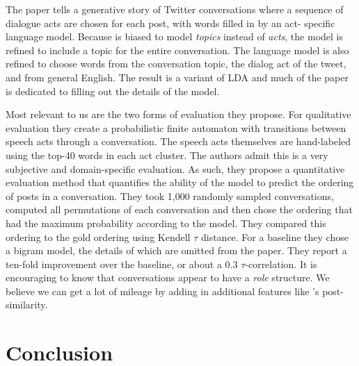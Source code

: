 \documentclass{article}
\begin{document}
The paper tells a generative story of Twitter conversations where a sequence
of dialogue acts are chosen for each post, with words filled in by an act-
specific language model. Because is biased to model \textit{topics} instead of
\textit{acts}, the model is refined to include a topic for the entire
conversation. The language model is also refined to choose words from the
conversation topic, the dialog act of the tweet, and from general English. The
result is a variant of LDA and much of the paper is dedicated to filling out
the details of the model.

Most relevant to us are the two forms of evaluation they propose. For
qualitative evaluation they create a probabilistic finite automaton with
transitions between speech acts through a conversation. The speech acts
themselves are hand-labeled using the top-40 words in each act cluster. The
authors admit this is a very subjective and domain-specific evaluation. As
such, they propose a quantitative evaluation method that quantifies the
ability of the model to predict the ordering of posts in a conversation. They
took 1,000 randomly sampled conversations, computed all permutations of each
conversation and then chose the ordering that had the maximum probability
according to the model. They compared this ordering to the gold ordering using
Kendell $\tau$ distance. For a baseline they chose a bigram model, the details
of which are omitted from the paper. They report a ten-fold improvement over
the baseline, or about a 0.3 $\tau$-correlation. It is encouraging to know
that conversations appear to have a \textit{role} structure. We believe we can
get a lot of mileage by adding in additional features like \cite{Wang2008a}'s
post-similarity.

\section{Conclusion}

{}

\end{document}
